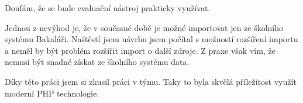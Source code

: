 Doufám, že se bude evaluační nástroj prakticky využívat.

Jednou z nevýhod je, že v současné době je možné importovat jen ze školního systému Bakaláři.
Naštěstí jsem návrhu jsem počítal s možností rozšíření importu a neměl by být problém rozšířit import o další zdroje.
Z praxe však vím, že nemusí být snadné získat ze školního systému data. 

Díky této práci jsem si zkusil práci v týmu.
Taky to byla skvělá příležitost využít moderní PHP technologie.
